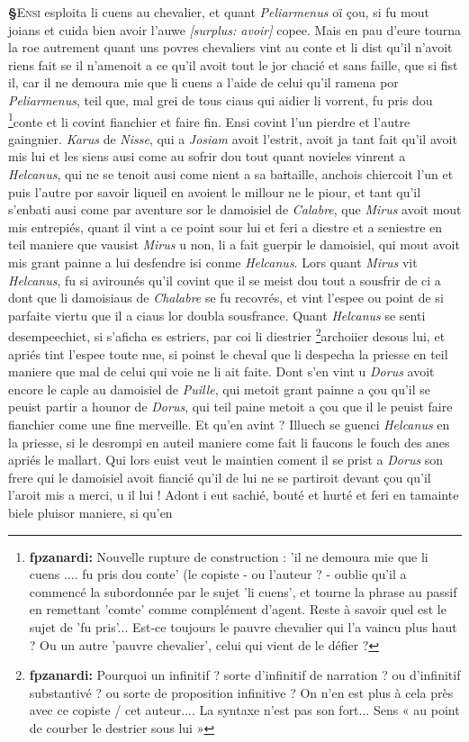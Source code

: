 \documentclass[12pt]{article} %
\newcommand{\persName}[1]{\emph{#1}} %
\newcommand{\placeName}[1]{\emph{#1}} %
\newcommand{\supplied}[1]{\textlangle#1\textrangle} %
\newcommand{\fnfpz}[1]{\footnote{\textbf{fpzanardi:} #1}} %
\newcommand{\del}[1]{\sout{#1}}      %
\newcommand{\surplus}[1]{\textit{[surplus: #1]}} %
\newcounter{paranum}
\newcommand{\pnum}{\stepcounter{paranum}\textbf{§\arabic{paranum}}\quad}
\begin{document}
\pnum \lettrine[lines=2]{\color{darkblue}E}{nsi} esploita li cuens au chevalier, et quant \persName{Peliarmenus} oï çou, si fu mout joians et cuida bien avoir l'auwe \surplus{avoir} copee. Mais en pau d'eure tourna la roe autrement quant uns povres chevaliers vint au conte et li dist qu'il n'avoit riens fait se il n'amenoit a ce qu'il avoit tout le jor chacié et sans faille, que si fist il, car il ne demoura mie que li cuens a l'aide de celui qu'il ramena por \persName{Peliarmenus}, teil que, mal grei de tous ciaus qui aidier li vorrent, fu pris dou \fnfpz{Nouvelle rupture de construction : 'il ne demoura mie que li cuens .... fu pris dou conte' (le copiste - ou l'auteur ? - oublie qu'il a commencé la subordonnée par le sujet 'li cuens', et tourne la phrase au passif en remettant 'comte' comme complément d'agent. Reste à savoir quel est le sujet de 'fu pris'... Est-ce toujours le pauvre chevalier qui l'a vaincu plus haut ? Ou un autre 'pauvre chevalier', celui qui vient de le défier ?}conte et li covint fianchier et faire fin. Ensi covint l'un pierdre et l'autre gaingnier. \persName{Karus} de \placeName{Nisse}, qui a \persName{Josiam} avoit l'estrit, avoit ja tant fait qu'il avoit mis lui et les siens ausi come au sofrir dou tout quant novieles vinrent a \persName{Helcanus}, qui ne se tenoit ausi come nient a sa ba\del{i}taille, anchois chiercoit l'un et puis l'autre por savoir liqueil en avoient le millour ne le piour, et tant qu'il s'enbati ausi come par aventure sor le damoisiel de \placeName{Calabre}, que \persName{Mirus} avoit mout mis entrepiés, q\supplied{ua}nt il vint a ce point sour lui et feri a diestre et a seniestre en teil maniere que vausist \persName{Mirus} u non, li a fait guerpir le damoisiel, qui mout avoit mis grant painne a lui desfendre isi conme \persName{Helcanus}. Lors quant \persName{Mirus} vit \persName{Helcanus}, fu si avirounés qu'il covint que il se meist dou tout a sousfrir de ci a dont que li damoisiaus de \placeName{Chalabre} se fu recovrés, et vint l'espee ou poi\supplied{n}t de si parfaite viertu que il a ciaus lor doubla sousfrance. Quant \persName{Helcanus} se senti desempeechiet, si s'aficha es estriers, par coi li diestrier \fnfpz{Pourquoi un infinitif ? sorte d'infinitif de narration ? ou d'infinitif substantivé ? ou sorte de proposition infinitive ? On n'en est plus à cela près avec ce copiste / cet auteur.... La syntaxe n'est pas son fort... Sens « au point de courber le destrier sous lui »}archoiier desous lui, et apriés tint l'espee toute nue, si poinst le cheval que li despecha la priesse en teil maniere que mal de celui qui voie ne li ait faite. Dont s'en vint u \persName{Dorus} avoit encore le caple au damoisiel de \placeName{Puille}, qui metoit grant painne a çou qu'il se peuist partir a hounor de \persName{Dorus}, qui teil paine metoit a çou que il le peuist faire fianchier come une fine merveille. Et qu'en avint ? Illuech se guenci \persName{Helcanus} en la priesse, si le desrompi en auteil maniere come fait li faucons le fouch des anes apriés le mallart. Qui lors euist veut le maintien coment il se prist a \persName{Dorus} son frere qui le damoisiel avoit fiancié qu'il de lui ne se partiroit devant çou qu'il l'aroit mis a merci, u il lui ! Adont i eut sachié, bouté et hurté et feri en tamainte biele pluisor maniere, si qu'en 
\end{document}
